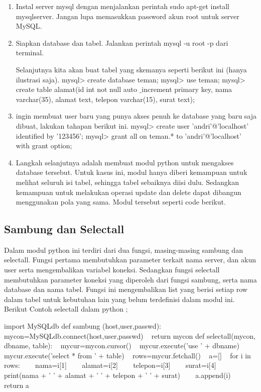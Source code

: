 	\begin{enumerate}
		\item Instal server mysql dengan menjalankan perintah sudo apt-get install mysqlserver. Jangan lupa memasukkan password akun root untuk server MySQL. 
		\item Siapkan database dan tabel. Jalankan perintah mysql -u root -p dari terminal. 

			Selanjutnya kita akan buat tabel yang skemanya seperti berikut ini (hanya ilustrasi saja). 
			mysql> create database teman; 
			mysql> use teman; \hspace*{1.69in}  
			mysql> create table alamat(id int not null auto $  \_  $increment primary key, nama varchar(35), alamat text, telepon varchar(15), surat text); 

		\item  ingin membuat user baru yang punya akses penuh ke database yang baru saja dibuat, lakukan tahapan berikut ini. 
			mysql> create user 'andri'@'localhost' identified by '123456'; 	
			mysql> grant all on teman.* to 'andri'@'localhost' with grant option; 

		\item Langkah selanjutnya adalah membuat modul python untuk mengakses database tersebut. Untuk kasus ini, modul hanya diberi kemampuan untuk melihat seluruh isi tabel, sehingga tabel sebaiknya diisi dulu. Sedangkan kemampuan untuk melakukan operasi update dan delete dapat dibangun menggunakan pola yang sama. Modul tersebut seperti code berikut. 
	\end{enumerate}


\subsection{Sambung dan Selectall}
Dalam modul python ini terdiri dari dua fungsi, masing-masing sambung dan selectall. Fungsi pertama membutuhkan parameter terkait nama server, dan akun user serta mengembalikan variabel koneksi. Sedangkan fungsi selectall membutuhkan parameter koneksi yang diperoleh dari fungsi sambung, serta nama database dan nama tabel. Fungsi ini mengembalikan list yang berisi setiap row dalam tabel untuk kebutuhan lain yang belum terdefinisi dalam modul ini. Berikut Contoh selectall dalam python ;
\vspace{12pt}

import MySQLdb
\noindent 
def sambung (host,user,passwd):
\noindent 
~ mycon=MySQLdb.connect(host,user,passwd) 
\noindent 
~ return mycon 
\vspace{12pt}
\noindent 
def selectall(mycon, dbname, table): 
\noindent 
~ mycur=mycon.cursor() 
\noindent 
~ mycur.execute('use ' + dbname) 
\noindent 
~ mycur.execute('select * from ' + table) 
\noindent 
~ rows=mycur.fetchall() 
\noindent 
~ a=[]
\noindent 
~ for i in rows: 
\noindent 
~~~ nama=i[1] 
\noindent 
~~~ alamat=i[2] 
\noindent 
~~~ telepon=i[3]
\noindent 
~~~ surat=i[4] 
\noindent 
~~~ print(nama + ' ' + alamat + ' ' + telepon + ' ' + surat)
\noindent 
~~~ a.append(i) 
\noindent 
~ return a 


